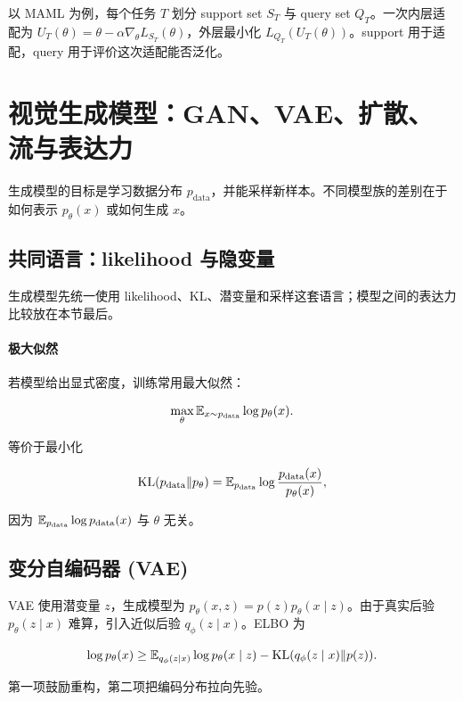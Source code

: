\documentclass[11pt]{ctexart}
\begin{document}
以 MAML 为例，每个任务 \(T\) 划分 support set \(S_T\) 与 query set \(Q_T\)。一次内层适配为 \(U_T(\theta)=\theta-\alpha\nabla_\theta L_{S_T}(\theta)\)，外层最小化 \(L_{Q_T}(U_T(\theta))\)。support 用于适配，query 用于评价这次适配能否泛化。

\section{视觉生成模型：GAN、VAE、扩散、流与表达力}


生成模型的目标是学习数据分布 \(p_{\mathrm{data}}\)，并能采样新样本。不同模型族的差别在于如何表示 \(p_\theta(x)\) 或如何生成 \(x\)。

\subsection{共同语言：likelihood 与隐变量}

生成模型先统一使用 likelihood、KL、潜变量和采样这套语言；模型之间的表达力比较放在本节最后。

\paragraph{极大似然}

若模型给出显式密度，训练常用最大似然：

\[
  \max_\theta
  \mathbb{E}_{x\sim p_{\mathrm{data}}}
  \log p_\theta(x).
\]

等价于最小化

\[
  \operatorname{KL}(p_{\mathrm{data}}\|p_\theta)
  =
  \mathbb{E}_{p_{\mathrm{data}}}
  \log
  \frac{p_{\mathrm{data}}(x)}{p_\theta(x)},
\]

因为 \(\mathbb{E}_{p_{\mathrm{data}}}\log p_{\mathrm{data}}(x)\) 与 \(\theta\) 无关。

\subsection{变分自编码器 (VAE)}


VAE 使用潜变量 \(z\)，生成模型为 \(p_\theta(x,z)=p(z)p_\theta(x\mid z)\)。由于真实后验 \(p_\theta(z\mid x)\) 难算，引入近似后验 \(q_\phi(z\mid x)\)。ELBO 为

\[
  \log p_\theta(x)
  \ge
  \mathbb{E}_{q_\phi(z\mid x)}
  \log p_\theta(x\mid z)
  -
  \operatorname{KL}(q_\phi(z\mid x)\|p(z)).
\]

第一项鼓励重构，第二项把编码分布拉向先验。
\end{document}
